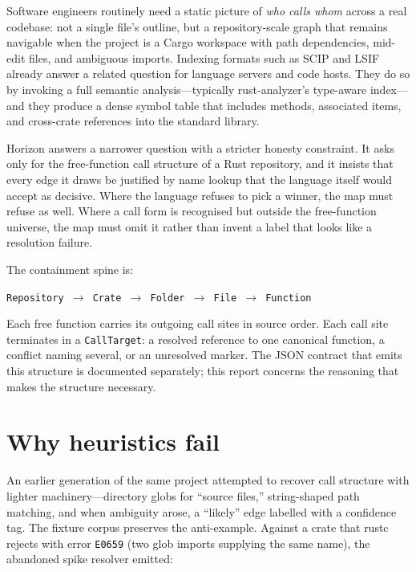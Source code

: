 \documentclass[11pt,a4paper,oneside]{report}
\newcommand{\horizon}{Horizon}
\begin{document}
Software engineers routinely need a static picture of \emph{who calls whom}
across a real codebase: not a single file's outline, but a repository-scale
graph that remains navigable when the project is a Cargo workspace with path
dependencies, mid-edit files, and ambiguous imports. Indexing formats such as
SCIP and LSIF~\cite{scip,lsif} already answer a related question for
language servers and code hosts. They do so by invoking a full semantic
analysis---typically rust-analyzer's type-aware index---and they produce a
dense symbol table that includes methods, associated items, and cross-crate
references into the standard library.

\horizon{} answers a narrower question with a stricter honesty constraint.
It asks only for the free-function call structure of a Rust repository, and
it insists that every edge it draws be justified by name lookup that the
language itself would accept as decisive. Where the language refuses to pick
a winner, the map must refuse as well. Where a call form is recognised but
outside the free-function universe, the map must omit it rather than invent a
label that looks like a resolution failure.

The containment spine is:

\begin{center}
\texttt{Repository $\rightarrow$ Crate $\rightarrow$ Folder $\rightarrow$ File $\rightarrow$ Function}
\end{center}

Each free function carries its outgoing call sites in source order. Each call
site terminates in a \texttt{CallTarget}: a resolved reference to one
canonical function, a conflict naming several, or an unresolved marker. The
JSON contract that emits this structure is documented separately; this report
concerns the reasoning that makes the structure necessary.

\section{Why heuristics fail}

An earlier generation of the same project attempted to recover call structure
with lighter machinery---directory globs for ``source files,'' string-shaped
path matching, and when ambiguity arose, a ``likely'' edge labelled with a
confidence tag. The fixture corpus preserves the anti-example. Against a crate
that rustc rejects with error \texttt{E0659} (two glob imports supplying the
same name), the abandoned spike resolver emitted:
\end{document}
